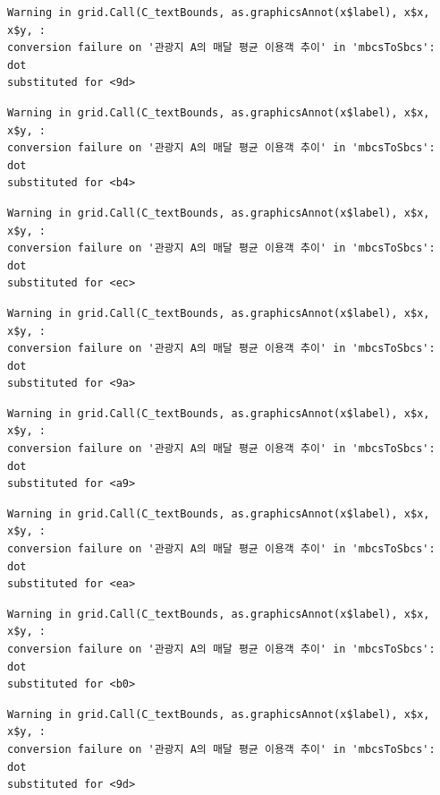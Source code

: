 \documentclass[
  letterpaper,
  DIV=11,
  numbers=noendperiod]{scrreprt}
\begin{document}
\begin{verbatim}
Warning in grid.Call(C_textBounds, as.graphicsAnnot(x$label), x$x, x$y, :
conversion failure on '관광지 A의 매달 평균 이용객 추이' in 'mbcsToSbcs': dot
substituted for <9d>
\end{verbatim}

\begin{verbatim}
Warning in grid.Call(C_textBounds, as.graphicsAnnot(x$label), x$x, x$y, :
conversion failure on '관광지 A의 매달 평균 이용객 추이' in 'mbcsToSbcs': dot
substituted for <b4>
\end{verbatim}

\begin{verbatim}
Warning in grid.Call(C_textBounds, as.graphicsAnnot(x$label), x$x, x$y, :
conversion failure on '관광지 A의 매달 평균 이용객 추이' in 'mbcsToSbcs': dot
substituted for <ec>
\end{verbatim}

\begin{verbatim}
Warning in grid.Call(C_textBounds, as.graphicsAnnot(x$label), x$x, x$y, :
conversion failure on '관광지 A의 매달 평균 이용객 추이' in 'mbcsToSbcs': dot
substituted for <9a>
\end{verbatim}

\begin{verbatim}
Warning in grid.Call(C_textBounds, as.graphicsAnnot(x$label), x$x, x$y, :
conversion failure on '관광지 A의 매달 평균 이용객 추이' in 'mbcsToSbcs': dot
substituted for <a9>
\end{verbatim}

\begin{verbatim}
Warning in grid.Call(C_textBounds, as.graphicsAnnot(x$label), x$x, x$y, :
conversion failure on '관광지 A의 매달 평균 이용객 추이' in 'mbcsToSbcs': dot
substituted for <ea>
\end{verbatim}

\begin{verbatim}
Warning in grid.Call(C_textBounds, as.graphicsAnnot(x$label), x$x, x$y, :
conversion failure on '관광지 A의 매달 평균 이용객 추이' in 'mbcsToSbcs': dot
substituted for <b0>
\end{verbatim}

\begin{verbatim}
Warning in grid.Call(C_textBounds, as.graphicsAnnot(x$label), x$x, x$y, :
conversion failure on '관광지 A의 매달 평균 이용객 추이' in 'mbcsToSbcs': dot
substituted for <9d>
\end{verbatim}
\end{document}
